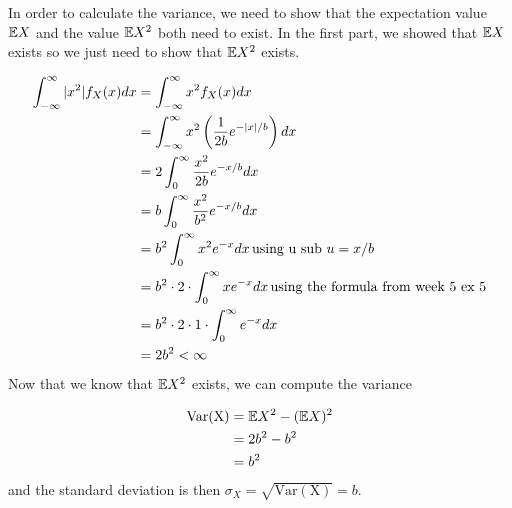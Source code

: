 
In order to calculate the variance, we need to show that the expectation value $ \mathbb{E} X$ and the value
$ \mathbb{E} X^2$ both need to exist. In the first part, we showed that $ \mathbb{E} X$ exists so we just need
to show that $ \mathbb{E} X^2$ exists.

\begin{align*}
    \int_{-\infty}^{\infty} |x^2| f_{X} (x) dx &= \int_{-\infty}^{\infty} x^2 f_{X} (x)dx\\
					       &= \int_{-\infty}^{\infty} x^2 \left( \frac{1}{2b}
					       e^{-|x|/b}  \right) dx\\
					       &= 2\int_{0}^{\infty} \frac{x^2}{2b}  e^{-x/b} dx\\
					       &= b \int_{0}^{\infty} \frac{x^2}{b^2} e^{-x/b	}
					       dx\\
					       &= b^2 \int_{0}^{\infty} x^2 e^{-x} dx \, \mbox{using u
					       sub $ u = x/b$} \\
					       &= b^2 \cdot 2 \cdot \int_{0}^{\infty} x e^{-x} dx
					       \, \mbox{using the formula from week 5 ex 5} \\
					       &= b^2 \cdot 2 \cdot 1 \cdot \int_{0}^{\infty} e^{-x}
					       dx\\
					       &= 2b^2 < \infty
\end{align*}
Now that we know that $ \mathbb{E} X^2$ exists, we can compute the variance

\begin{align*}
    \mathrm{Var(X)} &= \mathbb{E} X^2 - (\mathbb{E} X)^2\\
	    &= 2b^2 - b^2 \\
	    &= b^2
\end{align*}
and the standard deviation is then $ \sigma_{X} = \sqrt{\mathrm{Var(X)}} = b$.
